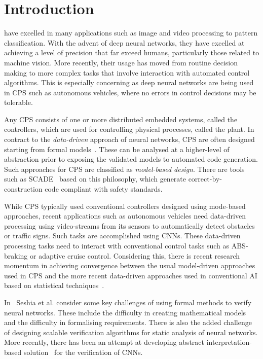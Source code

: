 \section{Introduction}
 have excelled in many applications such as
image and video processing to pattern classification. With the advent
of deep neural networks, they have excelled at achieving a level of
precision that far exceed humans, particularly those related to machine
vision.  More recently, their usage has moved from routine decision
making to more complex tasks that involve interaction with
automated control algorithms. This is especially concerning as deep neural networks are
being used in \acf{CPS} such as autonomous vehicles,
where no errors in control decisions may be tolerable. 

Any \ac{CPS}
consists of one or more distributed embedded systems, called the controllers, which are used
for controlling physical processes, called the plant.
In contract to the
\emph{data-driven} approach of neural networks, \ac{CPS} are often designed starting
from formal models~\cite{formal-methods}. These can be analysed at a
higher-level of abstraction prior to exposing the validated models to
automated code generation. Such approaches for
\ac{CPS} are classified as \emph{model-based design}. There are tools
such as SCADE~\cite{SCADE} based on this philosophy, which generate
correct-by-construction code compliant with safety standards.

While \ac{CPS} typically used conventional controllers designed using
mode-based approaches, recent applications such as
autonomous vehicles need data-driven processing using video-streams
from its sensors to automatically detect obstacles or traffic
signs. Such tasks are accomplished using \acfp{CNN}. These data-driven processing tasks need to interact with
conventional control tasks such as ABS-braking or adaptive cruise control.
Considering this, there is recent
research momentum in achieving convergence between the usual
model-driven approaches used in CPS and the more recent data-driven
approaches used in conventional AI based on statistical techniques~\cite{tripakis2018data}.

In~\cite{seshia2016towards} Seshia et al. consider some key challenges of 
using formal methods to verify neural networks. These include the
difficulty in creating mathematical models and the difficulty in
formalising requirements. There is also the
added challenge of designing scalable verification algorithms for
static analysis of neural networks. More recently, there has been
an attempt at developing abstract interpretation-based
solution~\cite{Gehr2018AI2SA} for the verification of CNNs. 

